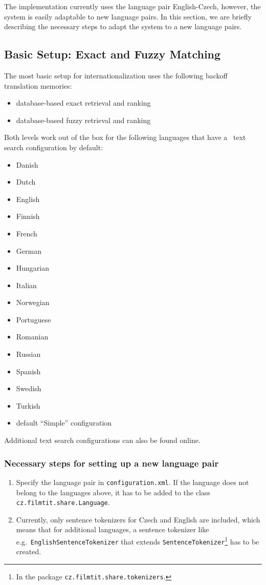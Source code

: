 The implementation currently uses the language pair English-Czech, however, the system is easily adaptable to new language pairs. In this section, we are briefly describing the necessary steps to adapt the system to a new language pairs.

\subsection{Basic Setup: Exact and Fuzzy Matching}

The most basic setup for internationalization uses the following backoff translation memories:

\begin{itemize}
	\item database-based exact retrieval and ranking
	\item database-based fuzzy retrieval and ranking
\end{itemize}

Both levels work out of the box for the following languages that have a \postgres~text search configuration by default:

\begin{itemize}
	\item Danish
	\item Dutch
	\item English
	\item Finnish
	\item French
	\item German
	\item Hungarian
	\item Italian
	\item Norwegian
	\item Portuguese
	\item Romanian
	\item Russian
	\item Spanish
	\item Swedish
	\item Turkish
	\item default “Simple” configuration
\end{itemize}

Additional text search configurations can also be found online.

\subsubsection*{Necessary steps for setting up a new language pair}

\begin{enumerate}
	\item Specify the language pair in {\tt configuration.xml}. If the language does not belong to the languages above, it has to be added to the class {\tt cz.filmtit.share.Language}.
	\item Currently, only sentence tokenizers for Czech and English are included, which means that for additional languages, a sentence tokenizer like e.g.\ {\tt EnglishSentenceTokenizer} that extends {\tt SentenceTokenizer}\footnote{In the package {\tt cz.filmtit.share.tokenizers}.} has to be created.
\end{enumerate}

